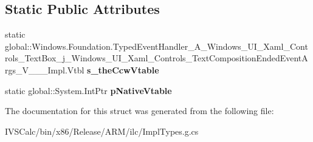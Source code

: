 \subsection*{Static Public Attributes}
\begin{DoxyCompactItemize}
\item 
\mbox{\label{struct_windows_1_1_foundation_1_1_typed_event_handler___a___windows___u_i___xaml___controls___te0b4df93de6e851b0934d485b06536178_a09f3e3a8bb35cae11629bb07e8ed8cbf}} 
static global\+::\+Windows.\+Foundation.\+Typed\+Event\+Handler\+\_\+\+A\+\_\+\+Windows\+\_\+\+U\+I\+\_\+\+Xaml\+\_\+\+Controls\+\_\+\+Text\+Box\+\_\+j\+\_\+\+Windows\+\_\+\+U\+I\+\_\+\+Xaml\+\_\+\+Controls\+\_\+\+Text\+Composition\+Ended\+Event\+Args\+\_\+\+V\+\_\+\+\_\+\+\_\+\+Impl.\+Vtbl {\bfseries s\+\_\+the\+Ccw\+Vtable}
\item 
\mbox{\label{struct_windows_1_1_foundation_1_1_typed_event_handler___a___windows___u_i___xaml___controls___te0b4df93de6e851b0934d485b06536178_ad296b1429eda903dfbbc0bc1e5407cc7}} 
static global\+::\+System.\+Int\+Ptr {\bfseries p\+Native\+Vtable}
\end{DoxyCompactItemize}


The documentation for this struct was generated from the following file\+:\begin{DoxyCompactItemize}
\item 
I\+V\+S\+Calc/bin/x86/\+Release/\+A\+R\+M/ilc/Impl\+Types.\+g.\+cs\end{DoxyCompactItemize}

